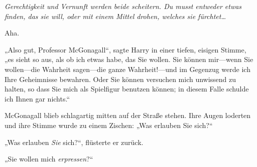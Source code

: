 \emph{Gerechtigkeit und Vernunft werden beide scheitern. Du musst entweder etwas finden, das sie will, oder mit einem Mittel drohen, welches sie fürchtet…}

Aha.

„Also gut, Professor McGonagall“, sagte Harry in einer tiefen, eisigen Stimme, „es sieht so aus, als ob ich etwas habe, das Sie wollen. Sie können mir—wenn Sie wollen—die Wahrheit sagen—die ganze Wahrheit!—und im Gegenzug werde ich Ihre Geheimnisse bewahren. Oder Sie können versuchen mich unwissend zu halten, so dass Sie mich als Spielfigur benutzen können; in diesem Falle schulde ich Ihnen gar nichts.“

McGonagall blieb schlagartig mitten auf der Straße stehen. Ihre Augen loderten und ihre Stimme wurde zu einem Zischen: „Was erlauben Sie sich?“

„Was erlauben \emph{Sie} sich?“, flüsterte er zurück.

„Sie wollen mich \emph{erpressen}?“

